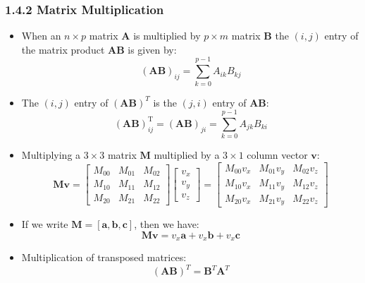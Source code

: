 \documentclass[11pt]{article}
\newcommand{\bm}[1]{\mathbf{#1}}
\begin{document}
\subsubsection*{1.4.2 Matrix Multiplication}
\begin{itemize}
    \item When an $n \times p$ matrix $\bm{A}$ is multiplied by $p \times m$ matrix $\bm{B}$ the
        $(i, j)$ entry of the matrix product $\bm{AB}$ is given by:
        \begin{equation}
            (\bm{AB})_{ij} = \sum_{k=0}^{p-1} A_{ik} B_{kj}
        \end{equation}

    \item The $(i, j)$ entry of $(\bm{AB})^T$ is the $(j, i)$ entry of $\bm{AB}$:
        \begin{equation}
            (\bm{AB})^\text{T}_{ij} = (\bm{AB})_{ji} = \sum_{k=0}^{p-1} A_{jk} B_{ki}
        \end{equation}

    \item Multiplying a $3 \times 3$ matrix $\bm{M}$ multiplied by a $3 \times 1$ column vector
        $\bm{v}$:
        $$
        \bm{Mv} =
        \begin{bmatrix}
            M_{00} & M_{01} & M_{02} \\
            M_{10} & M_{11} & M_{12} \\
            M_{20} & M_{21} & M_{22}
        \end{bmatrix}
        \begin{bmatrix}
            v_x \\
            v_y \\
            v_z
        \end{bmatrix} =
        \begin{bmatrix}
            M_{00} v_x & M_{01} v_y & M_{02} v_z \\
            M_{10} v_x & M_{11} v_y & M_{12} v_z \\
            M_{20} v_x & M_{21} v_y & M_{22} v_z
        \end{bmatrix}
        $$

\item If we write $\bm{M} = [\bm{a}, \bm{b}, \bm{c}]$, then we have:
    \begin{equation}
        \mathbf{Mv} = v_x \mathbf{a} + v_x \mathbf{b} + v_x \mathbf{c}
    \end{equation}
\item Multiplication of transposed matrices:
    \begin{equation}
        (\bm{AB})^T = \bm{B}^T \bm{A}^T
    \end{equation}
\end{itemize}
\end{document}
